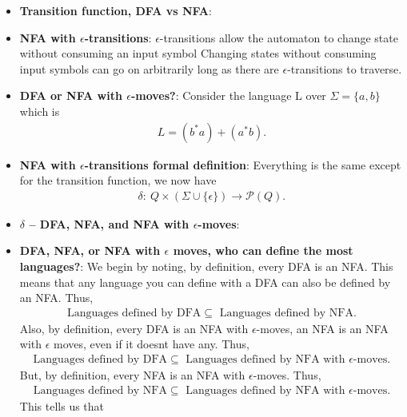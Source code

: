 \documentclass{report}
\begin{document}
\begin{itemize}
        \item \textbf{Transition function, DFA vs NFA}:
            \bigbreak \noindent 
        \item \textbf{NFA with $\epsilon$-transitions}: $\epsilon$-transitions allow the automaton to change state without
            consuming an input symbol
            \bigbreak \noindent 
            Changing states without consuming input symbols can go on arbitrarily long as there are $\epsilon$-transitions to traverse.
        \item \textbf{DFA or NFA with $\epsilon$-moves?}: Consider the language L over $\Sigma = \{a, b\}$ which is
            \begin{align*}
                L = (b^{*}a) + (a^{*}b)
            .\end{align*}
            \bigbreak \noindent 
        \item \textbf{NFA with $\epsilon$-transitions formal definition}: Everything is the same except for the transition function, we now have
            \begin{align*}
                \delta:\ Q \times (\Sigma \cup \{\epsilon\}) \to \mathcal{P}(Q)
            .\end{align*}
            \pagebreak \bigbreak \noindent 
        \item \textbf{$\delta$ – DFA, NFA, and NFA with $\epsilon$-moves}:
            \bigbreak \noindent 
        \item \textbf{DFA, NFA, or NFA with $\epsilon$ moves, who can define the most languages?}: We begin by noting, by definition, every DFA is an NFA. This means that any language you can define with a DFA can also be defined by an NFA. Thus,
            \begin{align*}
                \text{Languages defined by DFA} \subseteq \text{ Languages defined by NFA}
            .\end{align*}
            Also, by definition, every DFA is an NFA with $\epsilon$-moves, an NFA is an NFA with $\epsilon$ moves, even if it doesnt have any. Thus,
            \begin{align*}
                \text{Languages defined by DFA} \subseteq \text{ Languages defined by NFA with $\epsilon$-moves}
            .\end{align*}
            \bigbreak \noindent 
            But, by definition, every NFA is an NFA with $\epsilon$-moves. Thus,
            \begin{align*}
                \text{Languages defined by NFA} \subseteq \text{ Languages defined by NFA with $\epsilon$-moves}
            .\end{align*}
            \bigbreak \noindent 
            This tells us that
            \begin{itemize}
                

\end{itemize}
\end{itemize}
\end{document}
